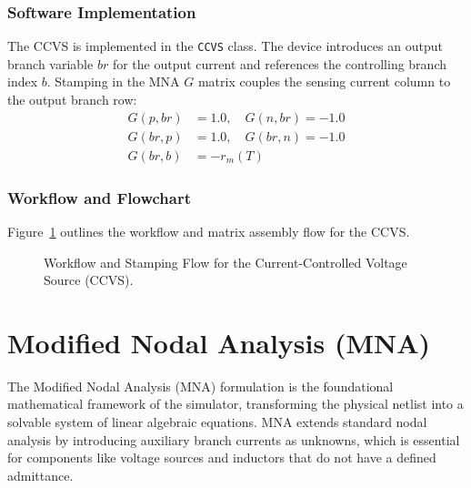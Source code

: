 \subsubsection{Software Implementation}
The CCVS is implemented in the \texttt{CCVS} class. The device introduces an output branch variable $br$ for the output current and references the controlling branch index $b$.
Stamping in the MNA $G$ matrix couples the sensing current column to the output branch row:
\begin{align}
    G(p, br) &= 1.0, \quad G(n, br) = -1.0 \\
    G(br, p) &= 1.0, \quad G(br, n) = -1.0 \\
    G(br, b) &= -r_m(T)
\end{align}

\subsubsection{Workflow and Flowchart}
Figure~\ref{fig:ccvs_flowchart} outlines the workflow and matrix assembly flow for the CCVS.

\begin{figure}[H]
    \centering
    \caption{Workflow and Stamping Flow for the Current-Controlled Voltage Source (CCVS).}
    \label{fig:ccvs_flowchart}
\end{figure}


\section{Modified Nodal Analysis (MNA)}
The Modified Nodal Analysis (MNA) formulation is the foundational mathematical framework of the simulator, transforming the physical netlist into a solvable system of linear algebraic equations. MNA extends standard nodal analysis by introducing auxiliary branch currents as unknowns, which is essential for components like voltage sources and inductors that do not have a defined admittance.

